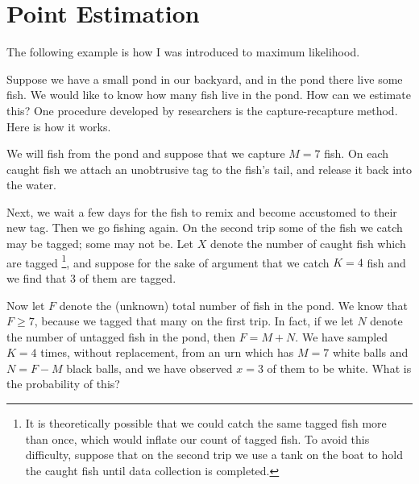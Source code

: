 \documentclass[captions=tableheading]{scrbook}
\begin{document}
\section{Point Estimation}
\label{sec-9-1}
\label{sec-Point-Estimation-1}


The following example is how I was introduced to maximum likelihood.

\begin{example}
Suppose we have a small pond in our backyard, and in the pond there live some fish. We would like to know how many fish live in the pond. How can we estimate this? One procedure developed by researchers is the capture-recapture method. Here is how it works.

We will fish from the pond and suppose that we capture \(M=7\) fish. On each caught fish we attach an unobtrusive tag to the fish's tail, and release it back into the water. 

Next, we wait a few days for the fish to remix and become accustomed to their new tag. Then we go fishing again. On the second trip some of the fish we catch may be tagged; some may not be. Let \(X\) denote the number of caught fish which are tagged
\footnote{It is theoretically possible that we could catch the same tagged fish more than once, which would inflate our count of tagged fish. To avoid this difficulty, suppose that on the second trip we use a tank on the boat to hold the caught fish until data collection is completed.},
and suppose for the sake of argument that we catch \(K=4\) fish and we find that 3 of them are tagged.

Now let \(F\) denote the (unknown) total number of fish in the pond. We know that \(F\geq7\), because we tagged that many on the first trip. In fact, if we let \(N\) denote the number of untagged fish in the pond, then \(F=M+N\). We have sampled \(K=4\) times, without replacement, from an urn which has \(M=7\) white balls and \(N=F-M\) black balls, and we have observed \(x=3\) of them to be white. What is the probability of this?


\end{example}
\end{document}
